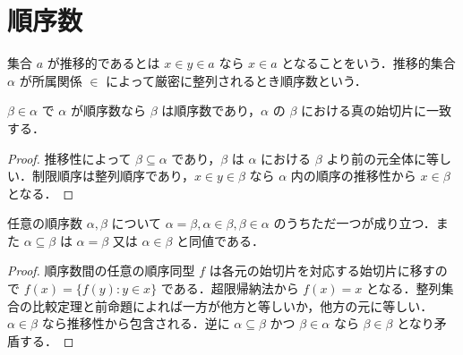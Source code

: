\section{順序数}
\begin{defn}[推移的集合と順序数]
集合 $a$ が推移的であるとは $x\in y\in a$ なら $x\in a$ となることをいう．推移的集合 $\alpha$ が所属関係 $\in$ によって厳密に整列されるとき順序数という．
\end{defn}
\begin{prop}[順序数の元と始切片]
$\beta\in\alpha$ で $\alpha$ が順序数なら $\beta$ は順序数であり，$\alpha$ の $\beta$ における真の始切片に一致する．
\end{prop}
\begin{proof}
推移性によって $\beta\subseteq\alpha$ であり，$\beta$ は $\alpha$ における $\beta$ より前の元全体に等しい．制限順序は整列順序であり，$x\in y\in\beta$ なら $\alpha$ 内の順序の推移性から $x\in\beta$ となる．
\end{proof}
\begin{prop}[順序数の比較]
任意の順序数 $\alpha,\beta$ について $\alpha=\beta,\alpha\in\beta,\beta\in\alpha$ のうちただ一つが成り立つ．また $\alpha\subseteq\beta$ は $\alpha=\beta$ 又は $\alpha\in\beta$ と同値である．
\end{prop}
\begin{proof}
順序数間の任意の順序同型 $f$ は各元の始切片を対応する始切片に移すので $f(x)=\{f(y):y\in x\}$ である．超限帰納法から $f(x)=x$ となる．整列集合の比較定理と前命題によれば一方が他方と等しいか，他方の元に等しい．$\alpha\in\beta$ なら推移性から包含される．逆に $\alpha\subseteq\beta$ かつ $\beta\in\alpha$ なら $\beta\in\beta$ となり矛盾する．
\end{proof}

